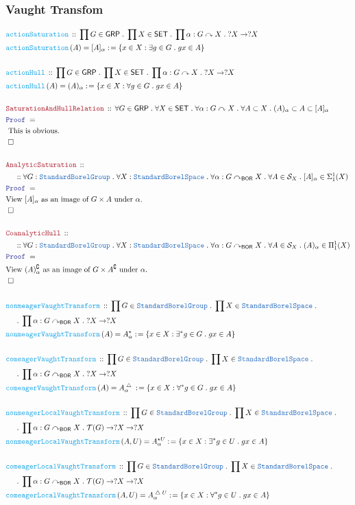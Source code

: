 \documentclass[12pt]{scrartcl}
\newcommand{\TYPE}[1]{\textcolor{NavyBlue}{\mathtt{#1}}}
\newcommand{\FUNC}[1]{\textcolor{Cerulean}{\mathtt{#1}}}
\newcommand{\LOGIC}[1]{\textcolor{Blue}{\mathtt{#1}}}
\newcommand{\THM}[1]{\textcolor{Maroon}{\mathtt{#1}}}
\renewcommand{\.}{\; . \;}
\newcommand{\de}{: \kern 0.1pc =}
\newcommand{\Act}[1]{\left( #1 \right)}
\newcommand{\Theorem}[2]{& \THM{#1} \, :: \, #2 \\ & \Proof = \\ }
\newcommand{\DeclareFunc}[2]{& \FUNC{#1} \, :: \, #2 \\}
\newcommand{\DefineNamedFunc}[4]{&  \FUNC{#1}\Act{#2} = #3 \de #4 \\}
\newcommand{\NewLine}{\\ & \kern 1pc}
\newcommand{\Page}[1]{ \begin{align*} #1 \end{align*}   }
\newcommand{\Explain}[1]{& \text{#1.} \\}
\newcommand{\du}{\; \triangle \;}
\renewcommand{\c}{\complement}
\newcommand{\QED}{\; \square}
\newcommand{\EndProof}{& \QED \\}
\newcommand{\Proof}{\LOGIC{Proof} \; }
\newcommand{\SET}{\mathsf{SET}}
\newcommand{\T}{\mathcal{T}}
\newcommand{\SBS}{\TYPE{StandardBorelSpace}}
\newcommand{\BOR}{\mathsf{BOR}}
\renewcommand{\S}{\mathcal{S}}
\newcommand{\ActOn}{\curvearrowright}
\newcommand{\GRP}{\mathsf{GRP}}
\newcommand{\SBG}{\TYPE{StandardBorelGroup}}
\renewcommand{\S}{\mathcal{S}}
\begin{document}
\subsubsection{Vaught Transfom}
\Page{
	\DeclareFunc{actionSaturation}
	{
		\prod G \in \GRP \. 
		\prod X \in \SET \.
		\prod \alpha : G \ActOn X \.
		?X \to ?X
	}
	\DefineNamedFunc{actionSaturation}{A}{[A]_\alpha}
	{
		\{  x \in X : \exists g \in G \. gx \in A \}
	}
	\\
	\DeclareFunc{actionHull}
	{
		\prod G \in \GRP \. 
		\prod X \in \SET \.
		\prod \alpha : G \ActOn X \.
		?X \to ?X
	}
	\DefineNamedFunc{actionHull}{A}{(A)_\alpha}
	{
		\{  x \in X : \forall g \in G \. gx \in A \}
	}
	\\
	\Theorem{SaturationAndHullRelation}
	{
		\forall G \in \GRP \.
		\forall X \in \SET \.
		\forall \alpha : G \ActOn X \.
		\forall A \subset X \.
		(A)_\alpha \subset A \subset [A]_\alpha
	}
	\Explain{ This is obvious}
	\EndProof
	\\
	\Theorem{AnalyticSaturation}
	{
		\NewLine ::
		\forall G : \SBG \.
		\forall X : \SBS \.
		\forall \alpha : G \ActOn_\BOR X \.
		\forall A \in \S_X \.
		[A]_\alpha \in \Sigma^1_1(X)
	}
	\Explain{View $[A]_\alpha$ as an image of $G \times A$ under $\alpha$}
	\EndProof
	\\
	\Theorem{CoanalyticHull}
	{
		\NewLine ::
		\forall G : \SBG \.
		\forall X : \SBS \.
		\forall \alpha : G \ActOn_\BOR X \.
		\forall A \in \S_X \.
		(A)_\alpha \in \Pi^1_1(X)
	}
	\Explain{View $(A)_\alpha^\c$ as an image of $G \times A^\c$ under $\alpha$}
	\EndProof
	\\
	\DeclareFunc{nonmeagerVaughtTransform}
	{
		\prod G \in \SBG \. 
		\prod X \in \SBS \. \NewLine \.
		\prod \alpha : G \ActOn_\BOR X \.
		?X \to ?X
	}
	\DefineNamedFunc{nonmeagerVaughtTransform}{A}{A^\star_\alpha}
	{
		\{  x \in X : \exists^* g \in G \. gx \in A \}
	}
	\\
	\DeclareFunc{comeagerVaughtTransform}
	{
		\prod G \in \SBG \. 
		\prod X \in \SBS \. \NewLine \.
		\prod \alpha : G \ActOn_\BOR X \.
		?X \to ?X
	}
	\DefineNamedFunc{comeagerVaughtTransform}{A}{A^{\du}_\alpha}
	{
		\{  x \in X : \forall^* g \in G \. gx \in A \}
	}
	\\
	\DeclareFunc{nonmeagerLocalVaughtTransform}
	{
		\prod G \in \SBG \. 
		\prod X \in \SBS \. \NewLine \.
		\prod \alpha : G \ActOn_\BOR X \.
		\T(G) \to ?X \to ?X
	}
	\DefineNamedFunc{nonmeagerLocalVaughtTransform}{A,U}{A^{\star U}_\alpha}
	{
		\{  x \in X : \exists^* g \in U \. gx \in A \}
	}
	\\
	\DeclareFunc{comeagerLocalVaughtTransform}
	{
		\prod G \in \SBG \. 
		\prod X \in \SBS \. \NewLine \.
		\prod \alpha : G \ActOn_\BOR X \.
		\T(G) \to ?X \to ?X
	}
	\DefineNamedFunc{comeagerLocalVaughtTransform}{A,U}{A^{\du U}_\alpha}
	{
		\{  x \in X : \forall^* g \in U \. gx \in A \}
	}
}
\end{document}
